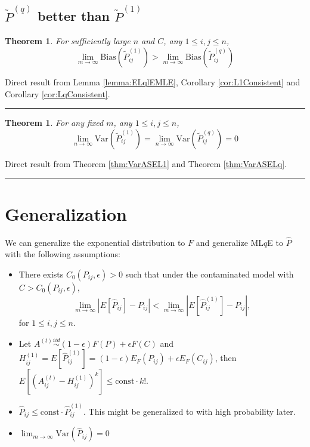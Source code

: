 \documentclass[a4paper]{article}
\newenvironment{proof}{{\bf Proof:  }}{\hfill\rule{2mm}{2mm}}
\newtheorem{theorem}[fact]{Theorem}
\begin{document}
\subsection{$\widetilde{P}^{(q)}$ better than $\widetilde{P}^{(1)}$}

\begin{theorem}
\label{thm:biasL1andLq}
For sufficiently large $n$ and $C$, any $1 \le i,j \le n$,
\[
	\lim_{m \to \infty} \mathrm{Bias}(\widetilde{P}_{ij}^{(1)})
    > \lim_{m \to \infty} \mathrm{Bias}(\widetilde{P}_{ij}^{(q)})
\]
\end{theorem}
\begin{proof}
Direct result from Lemma \ref{lemma:ELqlEMLE}, Corollary \ref{cor:L1Consistent} and Corollary \ref{cor:LqConsistent}.
\end{proof}


\begin{theorem}
\label{thm:varianceL1andLq}
For any fixed $m$, any $1 \le i,j \le n$,
\[
	\lim_{n \to \infty} \mathrm{Var}(\widetilde{P}_{ij}^{(1)})
    = \lim_{n \to \infty} \mathrm{Var}(\widetilde{P}_{ij}^{(q)}) = 0
\]
\end{theorem}
\begin{proof}
Direct result from Theorem \ref{thm:VarASEL1} and Theorem \ref{thm:VarASELq}.
\end{proof}




\newpage

\section{Generalization}

We can generalize the exponential distribution to $F$ and generalize ML$q$E to $\hat{P}$ with the following assumptions:
\begin{itemize}
\item There exists $C_0(P_{ij}, \epsilon) > 0$ such that under the contaminated model with $C > C_0(P_{ij}, \epsilon)$,
\[
	\lim_{m \to \infty} \left| E[\hat{P}_{ij}] - P_{ij} \right| < 
    \lim_{m \to \infty} \left| E[\hat{P}^{(1)}_{ij}] - P_{ij} \right|,
\]
for $1 \le i, j \le n$.
\item Let $A^{(t)} \stackrel{iid}{\sim} (1-\epsilon) F(P) + \epsilon F(C) $ and $H_{ij}^{(1)} = E[\hat{P}_{ij}^{(1)}] = (1-\epsilon) E_F(P_{ij}) + \epsilon E_F(C_{ij})$, then $E[(A_{ij}^{(t)} - H_{ij}^{(1)})^k] \le \mathrm{const} \cdot k!$.
\item $\hat{P}_{ij} \le \mathrm{const} \cdot \hat{P}_{ij}^{(1)}$. This might be generalized to with high probability later.
\item $\lim_{m \rightarrow \infty} \mathrm{Var}(\hat{P}_{ij}) = 0$
\end{itemize}
\end{document}
